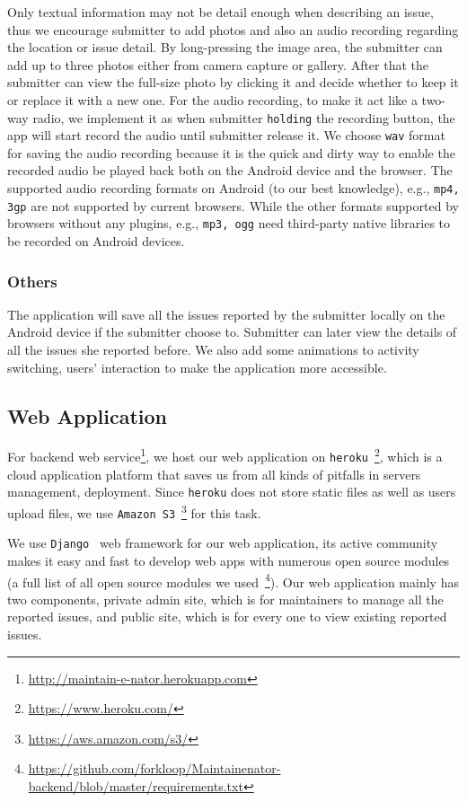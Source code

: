 \documentclass{acm_proc_article-sp}
\begin{document}
Only textual information may not be detail enough when describing an issue, thus we encourage submitter to add photos and 
also an audio recording regarding the location or issue detail. By long-pressing the image area,
the submitter can add up to three photos either from camera capture or gallery. After that the submitter can view the full-size photo by
clicking it and decide whether to keep it or replace it with a new one. For the audio recording, to make it act like a two-way radio,
we implement it as when submitter \texttt{holding} the recording button, the app will start record the audio until submitter release it.
We choose \texttt{wav} format for saving the audio recording because it is the quick and dirty way to enable the recorded
audio be played back both on the Android device and the browser.
The supported audio recording formats on Android (to our best knowledge), e.g., \texttt{mp4, 3gp} are not supported by current browsers. 
While the other formats supported by browsers without any plugins, e.g., \texttt{mp3, ogg} need third-party native libraries to be recorded on Android devices. 

\subsubsection{Others}
The application will save all the issues reported by the submitter locally on the Android device if the submitter choose to. Submitter can later
view the details of all the issues she reported before. We also add some animations to activity switching, users' interaction to make the application more accessible.

\subsection{Web Application}
For backend web service\footnote{\url{http://maintain-e-nator.herokuapp.com}}, 
we host our web application on \texttt{heroku}~\footnote{\url{https://www.heroku.com/}}, which is a
cloud application platform that saves us from all kinds of pitfalls in servers management, deployment. 
Since \texttt{heroku} does not store static files as well as users upload files, 
we use \texttt{Amazon S3}~\footnote{\url{https://aws.amazon.com/s3/}} for this task.

We use \texttt{Django}~\cite{django} web framework for our web application, its active community makes it easy and fast to develop web apps 
with numerous open source modules 
(a full list of all open source modules we used~\footnote{\url{https://github.com/forkloop/Maintainenator-backend/blob/master/requirements.txt}}). 
Our web application mainly has two components, private admin site, which is for maintainers to
manage all the reported issues, and public site, which is for every one to view existing reported issues.
\end{document}

